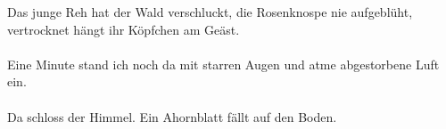 Das junge Reh hat der Wald verschluckt, die Rosenknospe nie aufgeblüht, vertrocknet hängt ihr Köpfchen am Geäst.\\\\
Eine Minute stand ich noch da mit starren Augen und atme abgestorbene Luft ein.\\\\
Da schloss der Himmel. Ein Ahornblatt fällt auf den Boden.